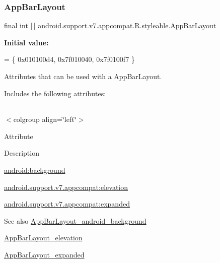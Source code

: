 \subsubsection{\texorpdfstring{App\+Bar\+Layout}{AppBarLayout}}
{\footnotesize\ttfamily final int \mbox{[}$\,$\mbox{]} android.\+support.\+v7.\+appcompat.\+R.\+styleable.\+App\+Bar\+Layout\hspace{0.3cm}{\ttfamily [static]}}

{\bfseries Initial value\+:}
\begin{DoxyCode}
= \{
            0x010100d4, 0x7f010040, 0x7f0100f7
        \}
\end{DoxyCode}
Attributes that can be used with a App\+Bar\+Layout. 

Includes the following attributes\+:

\tabulinesep=1mm
\begin{longtabu} spread 0pt [c]{*{0}{|X[-1]}|}
\hline
\end{longtabu}
$<$colgroup align=\char`\"{}left\char`\"{}$>$ 

Attribute

Description 

{\ttfamily \hyperlink{classandroid_1_1support_1_1v7_1_1appcompat_1_1R_1_1styleable_af0d3c21a0f872bb045adc8127c8f759a}{android\+:background}}

{\ttfamily \hyperlink{classandroid_1_1support_1_1v7_1_1appcompat_1_1R_1_1styleable_a49faefcaa55b3757d218b00d5575a9ef}{android.\+support.\+v7.\+appcompat\+:elevation}}

{\ttfamily \hyperlink{classandroid_1_1support_1_1v7_1_1appcompat_1_1R_1_1styleable_ab1802dee91330b4d0be4959f1d92c9da}{android.\+support.\+v7.\+appcompat\+:expanded}}

\begin{DoxySeeAlso}{See also}
\hyperlink{classandroid_1_1support_1_1v7_1_1appcompat_1_1R_1_1styleable_af0d3c21a0f872bb045adc8127c8f759a}{App\+Bar\+Layout\+\_\+android\+\_\+background} 

\hyperlink{classandroid_1_1support_1_1v7_1_1appcompat_1_1R_1_1styleable_a49faefcaa55b3757d218b00d5575a9ef}{App\+Bar\+Layout\+\_\+elevation} 

\hyperlink{classandroid_1_1support_1_1v7_1_1appcompat_1_1R_1_1styleable_ab1802dee91330b4d0be4959f1d92c9da}{App\+Bar\+Layout\+\_\+expanded} 
\end{DoxySeeAlso}
\mbox{\label{classandroid_1_1support_1_1v7_1_1appcompat_1_1R_1_1styleable_af0d3c21a0f872bb045adc8127c8f759a}} 
